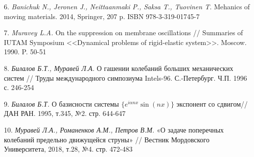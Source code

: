 
6. {\it Banichuk N., Jeronen J., Neittaanmaki P., Saksa T., Tuovinen T.} Mehanics of moving materials. 2014, Springer, 207 p. ISBN 978-3-319-01745-7

7. {\it Muravey L.A.} On the suppression on membrane oscillations // Summaries of IUTAM Symposium <<Dynamical problems of rigid-elastic system>>. Moscow. 1990. P. 50-51


8. {\it Билалов Б.Т., Муравей Л.А.} О гашении колебаний больших механических систем // Труды международного симпозиума Intels-96. С.-Петербург. Ч.П. 1996 с. 246-254

9. {\it Билалов Б.Т.} О базисности системы $\{e^{i\alpha nx}\sin(nx)\}$ экспонент со сдвигом// ДАН РАН. 1995, т.345, №2. стр. 644-647

10. {\it Муравей Л.А., Романенков А.М., Петров В.М.} «О задаче поперечных колебаний предельно движущейся струны» // Вестник Мордовского Университета, 2018, т.28, №4. стр. 472-483
